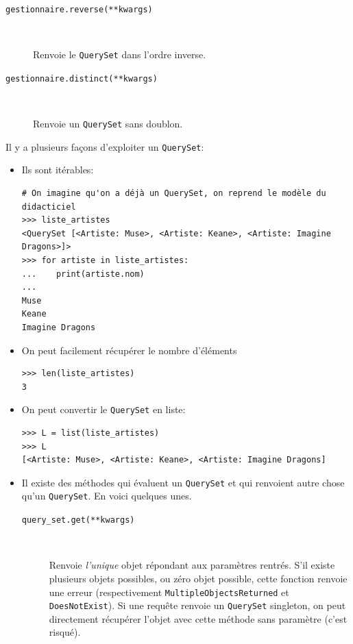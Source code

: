 \documentclass[a4paper, 10pt]{article}
\begin{document}
{\begin{description}
    \item[\texttt{gestionnaire.reverse(**kwargs)}]~

    Renvoie le \texttt{QuerySet} dans l'ordre inverse.

    \item[\texttt{gestionnaire.distinct(**kwargs)}]~

    Renvoie un \texttt{QuerySet} sans doublon.
\end{description}

Il y a plusieurs façons d'exploiter un \texttt{QuerySet}:
\begin{itemize}
    \item Ils sont itérables:
    \begin{verbatim}
# On imagine qu'on a déjà un QuerySet, on reprend le modèle du didacticiel
>>> liste_artistes
<QuerySet [<Artiste: Muse>, <Artiste: Keane>, <Artiste: Imagine Dragons>]>
>>> for artiste in liste_artistes:
...    print(artiste.nom)
...
Muse
Keane
Imagine Dragons
    \end{verbatim}

    \item On peut facilement récupérer le nombre d'éléments
    \begin{verbatim}
>>> len(liste_artistes)
3
    \end{verbatim}

    \item On peut convertir le \texttt{QuerySet} en liste:
    \begin{verbatim}
>>> L = list(liste_artistes)
>>> L
[<Artiste: Muse>, <Artiste: Keane>, <Artiste: Imagine Dragons]
    \end{verbatim}

    \item Il existe des méthodes qui évaluent un \texttt{QuerySet} et qui renvoient autre chose qu'un \texttt{QuerySet}. En voici quelques unes.

    \begin{description}
        \item[\texttt{query_set.get(**kwargs)}]~

        Renvoie \emph{l'unique} objet répondant aux paramètres rentrés. S'il existe plusieurs objets possibles, ou zéro objet possible, cette fonction renvoie une erreur (respectivement \texttt{MultipleObjectsReturned} et \texttt{DoesNotExist}). Si une requête renvoie un \texttt{QuerySet} singleton, on peut directement récupérer l'objet avec cette méthode sans paramètre (c'est risqué).


\end{description}
\end{itemize}}
\end{document}
